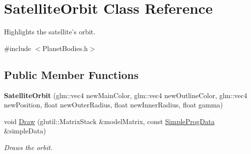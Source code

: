 \hypertarget{class_satellite_orbit}{\section{Satellite\-Orbit Class Reference}
\label{class_satellite_orbit}
}


Highlights the satellite's orbit.  




{\ttfamily \#include $<$Planet\-Bodies.\-h$>$}

\subsection*{Public Member Functions}
\begin{DoxyCompactItemize}
\item 
\hypertarget{class_satellite_orbit_a4cb167caa5abfa1ea61f14a52fa9d374}{{\bfseries Satellite\-Orbit} (glm\-::vec4 new\-Main\-Color, glm\-::vec4 new\-Outline\-Color, glm\-::vec4 new\-Position, float new\-Outer\-Radius, float new\-Inner\-Radius, float gamma)}\label{class_satellite_orbit_a4cb167caa5abfa1ea61f14a52fa9d374}

\item 
\hypertarget{class_satellite_orbit_a3b8ab0e39953aa153e6b76ecae5f624e}{void \hyperlink{class_satellite_orbit_a3b8ab0e39953aa153e6b76ecae5f624e}{Draw} (glutil\-::\-Matrix\-Stack \&model\-Matrix, const \hyperlink{struct_simple_prog_data}{Simple\-Prog\-Data} \&simple\-Data)}\label{class_satellite_orbit_a3b8ab0e39953aa153e6b76ecae5f624e}

\begin{DoxyCompactList}\small\item\em Draws the orbit. \end{DoxyCompactList}\end{DoxyCompactItemize}
